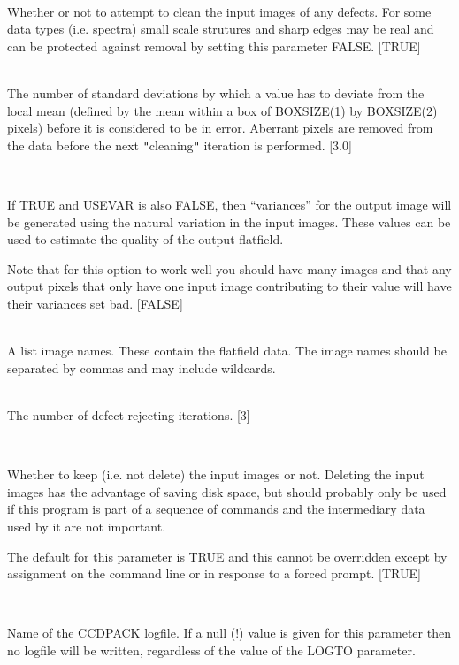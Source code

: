 \documentclass[twoside,11pt]{article}
\renewcommand{\_}{\texttt{\symbol{95}}}
\newcommand{\qt}[1]{{\tt "}#1{\tt "}}
\newcommand{\sstsubsection}[1]{ \item[{#1}] \mbox{} \\}
\newcommand{\sstsubsection}[1]{\item[{#1}]}
\begin{document}
{{{      }
      \sstsubsection{
         CLEAN = \_LOGICAL (Read)
      } {
         Whether or not to attempt to clean the input images of any
         defects. For some data types (i.e. spectra) small scale
         strutures and sharp edges may be real and can be protected
         against removal by setting this parameter FALSE.
         [TRUE]
      }
      \sstsubsection{
         GAMMA = \_REAL (Read)
      } {
         The number of standard deviations by which a value has to
         deviate from the local mean (defined by the mean within a box
         of BOXSIZE(1) by BOXSIZE(2) pixels) before it is considered to
         be in error. Aberrant pixels are removed from the data before
         the next \qt{cleaning} iteration is performed.
         [3.0]
      }

      \sstsubsection{
         GENVAR = \_LOGICAL (Read)
      } {
         If TRUE and USEVAR is also FALSE, then ``variances'' for the
         output image will be generated using the natural variation in
         the input images. These values can be used to estimate the
         quality of the output flatfield.

         Note that for this option to work well you should have many
         images and that any output pixels that only have one input
         image contributing to their value will have their variances 
         set bad.
         [FALSE]
      }

      \sstsubsection{
         IN = LITERAL (Read)
      } {
         A list image names. These contain the flatfield data.  The image
         names should be separated by commas and may include wildcards.
      }
      \sstsubsection{
         ITER = \_INTEGER (Read)
      } {
         The number of defect rejecting iterations.
         [3]
      }
      \sstsubsection{
         KEEPIN = \_LOGICAL (Read)
      } {
         Whether to keep (i.e. not delete) the input images or
         not. Deleting the input images has the advantage of saving disk
         space, but should probably only be used if this program is part
         of a sequence of commands and the intermediary data used by
         it are not important.

         The default for this parameter is TRUE and this cannot be
         overridden except by assignment on the command line or in
         response to a forced prompt.
         [TRUE]
      }
      \sstsubsection{
         LOGFILE = FILENAME (Read)
      } {
         Name of the CCDPACK logfile.  If a null (!) value is given for
         this parameter then no logfile will be written, regardless of
         the value of the LOGTO parameter.

}}}
\end{document}
